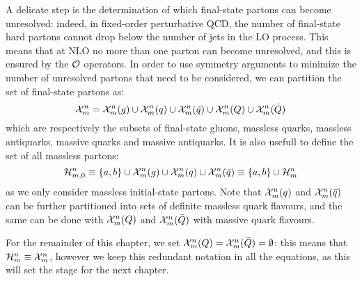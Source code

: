 A delicate step is the determination of which final-state partons can become unresolved: indeed, in fixed-order perturbative QCD, the number of final-state hard partons cannot drop below the number of jets in the LO process. This means that at NLO no more than one parton can become unresolved, and this is ensured by the $ \mathcal{O} $ operators. In order to use symmetry arguments to minimize the number of unresolved partons that need to be considered, we can partition the set of final-state partons as:
\begin{equation*}
  \mathcal{X}^{n}_{m} = \mathcal{X}^{n}_{m}(g) \cup \mathcal{X}^{n}_{m}(q) \cup \mathcal{X}^{n}_{m}(\bar{q}) \cup \mathcal{X}^{n}_{m}(Q) \cup \mathcal{X}^{n}_{m}(\bar{Q})
\end{equation*}
which are respectively the subsets of final-state gluons, massless quarks, massless antiquarks, massive quarks and massive antiquarks. It is also usefull to define the set of all massless partons:
\begin{equation*}
  \mathcal{H}^{n}_{m,0} \equiv \{a,b\} \cup \mathcal{X}^{n}_{m}(g) \cup \mathcal{X}^{n}_{m}(q) \cup \mathcal{X}^{n}_{m}(\bar{q}) \equiv \{a,b\} \cup \mathcal{H}^{n}_{m}
\end{equation*}
as we only consider massless initial-state partons. Note that $ \mathcal{X}^{n}_{m}(q) $ and $ \mathcal{X}^{n}_{m}(\bar{q}) $ can be further partitioned into sets of definite massless quark flavours, and the same can be done with $ \mathcal{X}^{n}_{m}(Q) $ and $ \mathcal{X}^{n}_{m}(\bar{Q}) $ with massive quark flavours.

For the remainder of this chapter, we set $ \mathcal{X}^{n}_{m}(Q) = \mathcal{X}^{n}_{m}(\bar{Q}) = \emptyset $: this means that $ \mathcal{H}^{n}_{m} \equiv \mathcal{X}^{n}_{m} $, however we keep this redundant notation in all the equations, as this will set the stage for the next chapter.

